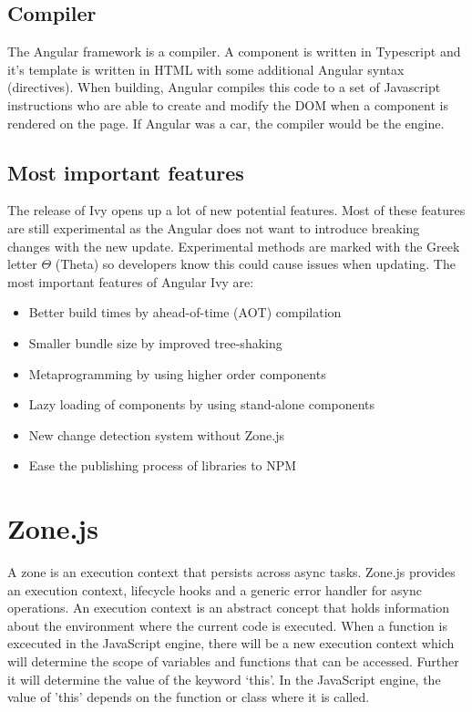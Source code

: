 \subsection{Compiler}
The Angular framework is a compiler. A component is written in Typescript and it's template is written in HTML with some additional Angular syntax (directives). When building, Angular compiles this code to a set of Javascript instructions who are able to create and modify the DOM when a component is rendered on the page. If Angular was a car, the compiler would be the engine.

\subsection{Most important features}
The release of Ivy opens up a lot of new potential features. Most of these features are still experimental as the Angular does not want to introduce breaking changes with the new update. Experimental methods are marked with the Greek letter \(\Theta\) (Theta) so developers know this could cause issues when updating. The most important features of Angular Ivy are:
\begin{itemize}
	\item Better build times by ahead-of-time (AOT) compilation
	\item Smaller bundle size by improved tree-shaking
	\item Metaprogramming by using higher order components \autocite{Savkin2018}
	\item Lazy loading of components by using stand-alone components
	\item New change detection system without Zone.js
	\item Ease the publishing process of libraries to NPM
\end{itemize}

\autocite{Exbrayat2019}


\section{Zone.js}
A zone is an execution context that persists across async tasks. Zone.js provides an execution context, lifecycle hooks and a generic error handler for async operations. An execution context is an abstract concept that holds information about the environment where the current code is executed. When a function is excecuted in the JavaScript engine, there will be a new execution context which will determine the scope of variables and functions that can be accessed. Further it will determine the value of the keyword ‘this’. In the JavaScript engine, the value of 'this' depends on the function or class where it is called.

